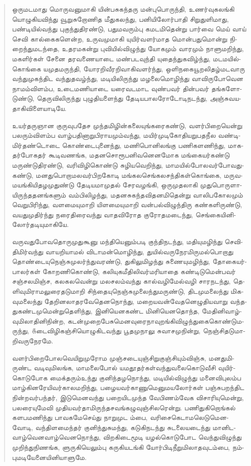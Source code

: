 \documentclass{article}
\newcommand{\TamilText}[1]{\texttamil{#1}}
\newcommand{\tam}[1]{\TamilText{#1}}
\begin{document}
\begin{quotation}\small
\tam{ஒருமடமாது மொருவனுமாகி யின்பசுகந்தரு மன்புபொருந்தி}, \tam{உணர்வுகலங்கி யொழுகியவிந்து வூறுசுறோணித மீதுகலந்து}, \tam{பனியிலோர்பாதி சிறுதுளிமாது}, \tam{பண்டியில்வந்து புகுந்துதிரண்டு}, \tam{பதுமவரும்பு கமடமிதென்று பார்வை மெய்‌ வாய்‌ செவி கால்கைகளென்‌ற}, \tam{உருவமுமாகி யுயிர்‌வளர்மாத மொன்பதுமொன்று நிறைந்துமடந்தை}, \tam{உதரமகன்று புவியில்விழுந்து யோகமும்‌ வாரமும்‌ நாளுமறிந்து}, \tam{மகளிர்கள்‌ சேனை தரவணையாடை மண்படவுந்தி யுதைந்துகவிழ்‌ந்து}, \tam{மடமயில்கொங்கை யமுதமருந்தி}, \tam{யோரறிவீரறிவாகிவளர்ந்து}, \tam{ஒளிநகையூறலிதழ்மடவாரு வந்துமுகந்திட வந்துதவழ்ந்து}, \tam{மடியிலிருந்து மழலைமொழிந்து வாவிருபோவென நாமம்விளம்ப}, \tam{உடைமணியாடை யரைவடமாட வுண்பவர்‌ தின்பவர்‌ தங்களோடுண்டு}, \tam{தெருவிலிருந்து புழுதியளைந்து தேடியபாலரோடோடிநடந்து}, \tam{அஞ்சுவயதாகிவிளையாடியே}.

\tam{உயர்தருஞான குருவுபதேச முந்தமிழின்கலையுங்கரைகண்டு}, \tam{வளர்பிறையென்று பலரும்விளம்ப வாழ்பதினாறுபிராயமும்வந்து}, \tam{மயிர்‌முடிகோதியறுபதநீல வண்டிமிர்தண்டொடை கொண்டைபுனைந்து}, \tam{மணிபொனிலங்கு பணிகளணிந்து}, \tam{மாகதர்போகதர்‌ கூடிவணங்க}, \tam{மதனசொரூபனிவனெனமோக மங்கையர்கண்டு மருண்டுதிரண்டு}, \tam{வரிவிழிகொண்டு சுழியவெறிந்து}, \tam{மாமயில்போலவர்‌போவதுகண்டு}, \tam{மனதுபொறாமலவர்பிறகோடி மங்கலசெங்கலசந்திகள்‌கொங்கை}, \tam{மருவமயங்கியிதழமுதுண்டு தேடியமாமுதல்‌ சேரவழங்‌கி}, \tam{ஒருமுதலாகி முதுபொருளாயிருந்ததனங்களும்‌ வம்பிலிழந்து}, \tam{மதனசுகந்தவிதனமிதென்று வாலிபகோலமும்‌ வெறுபிரிந்து}, \tam{வளமையுமாறி யிளமையுமாறி வன்பல்விழுந்திரு கண்களிருண்டு}, \tam{வயதுமுதிர்ந்து நரைதிரைவந்து வாதவிரோத குரோதமடைந்து}, \tam{செங்‌கையினிலோர்தடியுமாகியே}.

\tam{வருவதுபோவதொருமுதுகூனு மந்தியெனும்படி குந்திநடந்து}, \tam{மதியுமழிந்து செவிதிமிர்வந்து வாயறியாமல்‌ விடாமன்மொழிந்து}, \tam{துயில்வருநேரமிருமல்பொறாது தொண்டையுநெஞ்சுமுலர்‌ந்துவரண்டு}, \tam{துகிலுமிழந்து சுணையுமழிந்து}, \tam{தோகையர்பாலர்கள்‌ கோறணிகொண்டு}, \tam{கலியுகமீதிலிவர்மரியாதை கண்டிடுமென்பவர்‌ சஞ்சலமிஞ்ச}, \tam{கலகலவென்று மலசலம்வந்து கால்வழிமேல்வழி சாரநடந்து}, \tam{தெளிவுமிராமலுரைதடுமாறி சிந்தையுநெஞ்சுமுலைந்துமருண்டு}, \tam{திடமுமலைந்து மிகவுமலைந்து தேறினலாதரவேதெனநொந்து}, \tam{மறையவன்வேதனெழுதியவாறு வந்ததுகண்டமுமென்றுதெளிந்து}, \tam{இனியெனகண்ட மினியெனதொந்த}, \tam{மேதினிவாழ்வுமிலாதினிநின்ற}, \tam{கடன்‌முறைபேசுமெனவுரைநாவுறங்கிவிழுந்துகைகொண்டுமருந்து}, \tam{௧டைவிழிகஞ்சியொழுகிடவந்து பூதமுநாலு சுவாசமுநின்று}, \tam{நெஞ்‌சிதடுமாறிவருநேரமே}.

\tam{வளர்பிறைபோலவெயிறுமுரோம முஞ்சடையுஞ்சிறுகுஞ்சியும்விஞ்சு}, \tam{மனதுமிருண்ட வடிவுமிலங்க}, \tam{மாமலைபோல்‌ யமதூதர்கள்‌வந்துவலைகொடுவீசி வுயிர்கொடுபோக மைக்தரும்‌உந்து குனிந்தழநொந்து}, \tam{மடியில்விழுந்து மனைவிபுலம்‌ப மாழ்கினரேயிவர்காலமறிந்து}, \tam{பழையவர்காணுமெனுமயலோர்கள்‌ பஞ்சுபறந்திட நின்றவர்பந்தர்‌}, \tam{இடுமெனவந்து பறையிடமுந்த வேபிணம்‌வேக விசாரியுமென்று}, \tam{பலரையுமேவி முதியவர்தாமிருந்தசவங்கழுவுஞ்சிலரென்று}. \tam{பணிதுகிறொங்கல்‌ களபமணிந்து பாவகமேசெய்து நாறுமுட ம்பை}, \tam{வரிசைகெடாமலெடுமெனவோடி}, \tam{வந்திளமைந்தர்‌ குனிந்துசுமந்து}, \tam{கடுகிநடந்து சுடலையடைந்து மானிடவாழ்வெனவாழ்‌வெனநொந்து}, \tam{விறகிடைமூடி யழல்‌கொடுபோட வெந்துவிழுந்து முறிந்துநிணங்க}, \tam{ளுருகியெலும்பு கருகியடங்கி யோர்பிடிநீறுமிலாதவுடம்பை}, \tam{நம்புமடியேனையினியாளுமே}.
\end{quotation}
\end{document}
